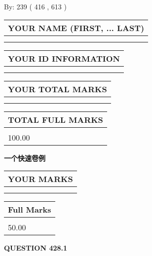 \documentclass{ctexart}
\begin{document}
   
\hspace{1.0in} By: 
 239 ( 416 ,  613 )
   
   
   
   
\newpage 
\setcounter{page}{ 
   428001 } 
   
   
   
   
\noindent\begin{tabular}{|l|}
\hline
YOUR NAME (FIRST, ... LAST)  \\
\hline
 \\ 
 \\ 
\hline
\end{tabular}
\hspace{0.05in} \begin{tabular}{|l|}
\hline
 YOUR   ID   INFORMATION  \\
\hline
 \\ 
 \\ 
\hline
\end{tabular}
   
   
\vspace{0.2in}\noindent\begin{tabular}{|l|}
\hline
YOUR TOTAL MARKS  \\
\hline
 \\ 
 \\ 
\hline
\end{tabular}
\hspace{0.05in} \begin{tabular}{|l|}
\hline
TOTAL FULL MARKS  \\
\hline
 \\ 
100.00 \\
\hline
\end{tabular}
   
   
 \vspace{0.2in}
{\LARGE {\textbf{ 一个快速卷例}}}
   
   
  
\vspace{0.2in}
  
\noindent\begin{tabular}{|l|}
\hline
 YOUR MARKS  \\
\hline
 \\ 
 \\ 
\hline
\end{tabular}
\hspace{0.05in} \begin{tabular}{|l|}
\hline
 Full Marks  \\
\hline
 \\ 
50.00 \\
\hline
\end{tabular}
{\textbf{\Large{QUESTION
428.1 
}}}
  
\end{document}
